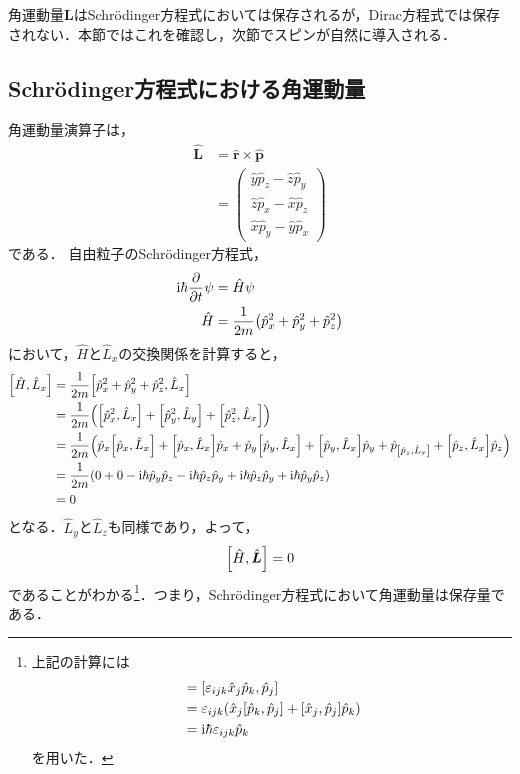 \documentclass{report}
\begin{document}
  角運動量$\bm{L}$はSchrödinger方程式においては保存されるが，Dirac方程式では保存されない．本節ではこれを確認し，次節でスピンが自然に導入される．
  \subsection{Schrödinger方程式における角運動量}
    角運動量演算子は，
    \begin{align}
      \hat{\bm{L}} &= \hat{\bm{r}} \times \hat{\bm{p}}\\
      &= \begin{pmatrix}
        \hat{y}\hat{p}_z - \hat{z}\hat{p}_y\\
        \hat{z}\hat{p}_x - \hat{x}\hat{p}_z\\
        \hat{x}\hat{p}_y - \hat{y}\hat{p}_x
      \end{pmatrix}
    \end{align}
    である．
    自由粒子のSchrödinger方程式，
    \begin{align}
      \mathrm{i} \hbar \pdv{t}\psi &= \hat{H} \psi\\
      \hat{H} &= \frac{1}{2m}\qty(\hat{p}_x^2 + \hat{p}_y^2 + \hat{p}_z^2)
    \end{align}
    において，$\hat{H}$と$\hat{L}_x$の交換関係を計算すると，
    \begin{align}
      \qty[\hat{H},\hat{L}_x] &= \frac{1}{2m}\qty[\hat{p}_x^2 + \hat{p}_y^2 + \hat{p}_z^2, \hat{L}_x]\\
      &= \frac{1}{2m}\qty(\qty[\hat{p}_x^2, \hat{L}_x] + \qty[\hat{p}_y^2, \hat{L}_y] + \qty[\hat{p}_z^2, \hat{L}_x])\\
      &=\frac{1}{2m}\qty(\hat{p}_x\qty[\hat{p}_x,\hat{L}_x] + \qty[\hat{p}_x,\hat{L}_x]\hat{p}_x + \hat{p}_y\qty[\hat{p}_y,\hat{L}_x] + \qty[\hat{p}_y,\hat{L}_x]\hat{p}_y
      + \hat{p}_ \qty[\hat{p}_z,\hat{L}_x] + \qty[\hat{p}_z,\hat{L}_x]\hat{p}_z)\\
      &= \frac{1}{2m}\qty(0 + 0 -\mathrm{i}\hbar\hat{p}_y\hat{p}_z - \mathrm{i}\hbar\hat{p}_z\hat{p}_y + \mathrm{i}\hbar\hat{p}_z\hat{p}_y + \mathrm{i}\hbar\hat{p}_y\hat{p}_z)\\
      &= 0
    \end{align}
    となる．$\hat{L}_y$と$\hat{L}_z$も同様であり，よって，
    \begin{align}
      \qty[\hat{H},\hat{\bm{L}}] = 0
    \end{align}
    であることがわかる\footnote{
      上記の計算には
      \begin{align}
        [\hat{L}_i,\hat{p}_j] &= [\epsilon_{ijk}\hat{x}_j\hat{p}_k, \hat{p}_j]\\
        &=\epsilon_{ijk}\qty(\hat{x}_j[\hat{p}_k,\hat{p}_j] + [\hat{x}_j, \hat{p}_j]\hat{p}_k)\\
        &= \i\hbar\epsilon_{ijk}\hat{p}_k
      \end{align}
    を用いた．
    }．つまり，Schrödinger方程式において角運動量は保存量である．
\end{document}
